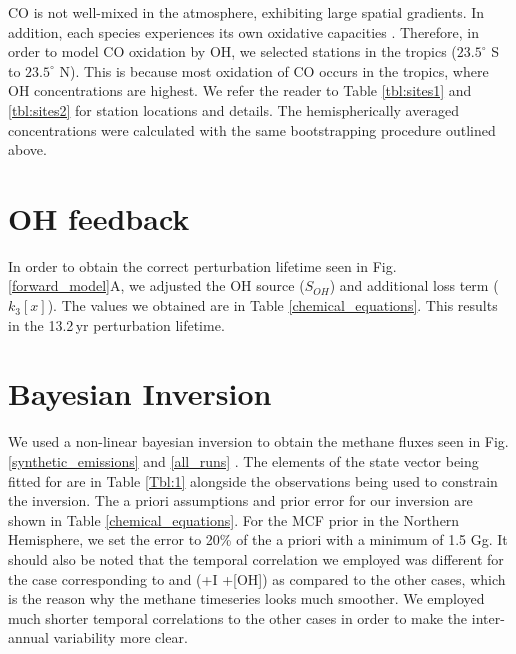 \documentclass[grl]{agutexSI2019}
\begin{document}
\begin{article}
CO is not well-mixed in the atmosphere, exhibiting large spatial gradients. In addition, each species experiences its own oxidative capacities \cite{naus_constraints_2019, lawrence_what_2001}. Therefore, in order to model CO oxidation by OH, we selected stations in the tropics ($23.5^\circ$ S to $23.5^\circ$ N). This is because most oxidation of CO occurs in the tropics, where OH concentrations are highest. We refer the reader to Table \ref{tbl:sites1} and \ref{tbl:sites2} for station locations and details. The hemispherically averaged concentrations were calculated with the same bootstrapping procedure outlined above.

\section{OH feedback}
In order to obtain the correct perturbation lifetime seen in Fig. \ref{forward_model}A, we adjusted the OH source ($S_{OH}$) and additional loss term ($k_3[x]$). The values we obtained are in Table \ref{chemical_equations}. This results in the 13.2\,yr perturbation lifetime.

\section{Bayesian Inversion} 
We used a non-linear bayesian inversion to obtain the methane fluxes seen in Fig. \ref{synthetic_emissions} and \ref{all_runs} \cite{rodgers_inverse_2000}. The elements of the state vector being fitted for are in Table \ref{Tbl:1} alongside the observations being used to constrain the inversion. The a priori assumptions and prior error for our inversion are shown in Table \ref{chemical_equations}. For the MCF prior in the Northern Hemisphere, we set the error to 20\% of the a priori with a minimum of 1.5 Gg. It should also be noted that the temporal correlation we employed was different for the case corresponding to \cite{rigby_role_2017} and \cite{turner_ambiguity_2017} (+I +[OH]) as compared to the other cases, which is the reason why the methane timeseries looks much smoother. We employed much shorter temporal correlations to the other cases in order to make the inter-annual variability more clear. 









\end{article}
\end{document}
